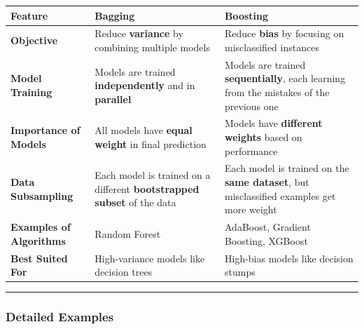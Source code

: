 \documentclass[12pt]{book}
\begin{document}
\begin{longtable}[]{@{}
  >{\raggedright\arraybackslash}p{}
  >{\raggedright\arraybackslash}p{}
  >{\raggedright\arraybackslash}p{}@{}}
\toprule\noalign{}
\begin{minipage}[b]{\linewidth}\raggedright
Feature
\end{minipage} & \begin{minipage}[b]{\linewidth}\raggedright
\textbf{Bagging}
\end{minipage} & \begin{minipage}[b]{\linewidth}\raggedright
\textbf{Boosting}
\end{minipage} \\
\midrule\noalign{}
\endhead
\bottomrule\noalign{}
\endlastfoot
\textbf{Objective} & Reduce \textbf{variance} by combining multiple
models & Reduce \textbf{bias} by focusing on misclassified instances \\
\textbf{Model Training} & Models are trained \textbf{independently} and
in \textbf{parallel} & Models are trained \textbf{sequentially}, each
learning from the mistakes of the previous one \\
\textbf{Importance of Models} & All models have \textbf{equal weight} in
final prediction & Models have \textbf{different weights} based on
performance \\
\textbf{Data Subsampling} & Each model is trained on a different
\textbf{bootstrapped subset} of the data & Each model is trained on the
\textbf{same dataset}, but misclassified examples get more weight \\
\textbf{Examples of Algorithms} & Random Forest & AdaBoost, Gradient
Boosting, XGBoost \\
\textbf{Best Suited For} & High-variance models like decision trees &
High-bias models like decision stumps \\
\end{longtable}

\begin{center}\rule{0.5\linewidth}{0.5pt}\end{center}

\subsubsection{\texorpdfstring{\textbf{Detailed
Examples}}{Detailed Examples}}\label{detailed-examples}
\end{document}

